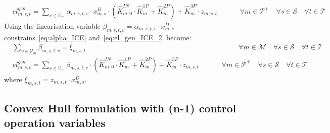 \documentclass{article}
\newcommand{\cT}{{\mathcal T}}
\newcommand{\cM}{{\mathcal M}}
\newcommand{\cP}{{\mathcal P}}
\newcommand{\cS}{{\mathcal S}}
\newcommand{\cV}{{\mathcal V}}
\begin{document}
{		\begin{align}
		& el_{m,s,t}^{gen} = \sum_{v \in \cV_m} \alpha_{m,s,t,v} \cdot x_{m,s}^D \cdot (\hat{K}_{m,0}^{IN} \cdot \hat{K}_{m}^{1P} + \hat{K}_{m}^{2P} ) + \hat{K}_{m}^{3P} \cdot z_{m,s,t} & \hspace{1cm} \forall m \in \cP^+ \quad \forall s \in \cS \quad \forall t \in \cT \label{eq:el_gen_ICE_2}
		\end{align}
Using the linearisation variable $\beta_{m,s,t,v} = \alpha_{m,s,t,v} \cdot x_{m,s}^D$ constrains~\eqref{eq:alpha_ICE} and~\eqref{eq:el_gen_ICE_2} become:
		\begin{align}
		&\sum_{v \in \cV_m} \beta_{m,s,t,v} = \xi_{m,s,t} & \hspace{2cm} \forall m \in \cM \quad \forall s \in \cS \quad \forall t \in \cT \label{eq:xi_ICE} \\
		& el_{m,s,t}^{gen} = \sum_{v \in \cV_m} \beta_{m,s,t,v} \cdot (\hat{K}_{m,0}^{IN} \cdot \hat{K}_{m}^{1P} + \hat{K}_{m}^{2P} ) + \hat{K}_{m}^{3P} \cdot z_{m,s,t} & \hspace{1cm} \forall m \in \cP^+ \quad \forall s \in \cS \quad \forall t \in \cT \label{eq:el_gen_ICE_3}
		\end{align}
where $\xi_{m,s,t}= z_{m,s,t} \cdot x_{m,s}^D$.


\subsection{Convex Hull formulation with (n-1) control operation variables}

}
\end{document}
